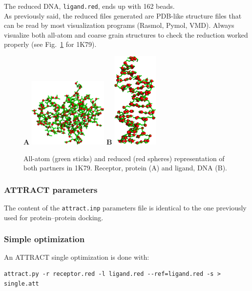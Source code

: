 \documentclass[12pt,a4paper]{article}
\begin{document}
The reduced DNA, {\tt ligand.red}, ends up with 162 beads. \\

As previously said, the reduced files generated are PDB-like structure files 
that can be read by most visualization programs (Rasmol, Pymol, VMD). 
Always visualize both all-atom and coarse grain structures to check the 
reduction worked properly (see Fig.~\ref{1K79_at_cg} for 1K79).

\begin{figure}[htbp]
\center
{\textbf A}
\includegraphics*[width=0.35\textwidth]{img/1K79_receptor.png}
\hspace*{2cm}
{\textbf B}
\includegraphics*[width=0.20\textwidth]{img/1K79_ligand.png}
\caption{All-atom (green sticks) and reduced (red spheres) representation 
of both partners in 1K79. Receptor, protein (A) and ligand, DNA (B).}
\label{1K79_at_cg}
\end{figure}

\subsubsection{ATTRACT parameters}
The content of the {\tt attract.inp} parameters file is identical to the one
previously used for protein--protein docking.

\subsubsection{Simple optimization}

An ATTRACT single optimization is done with:
\begin{verbatim}
attract.py -r receptor.red -l ligand.red --ref=ligand.red -s > single.att
\end{verbatim}
\end{document}
